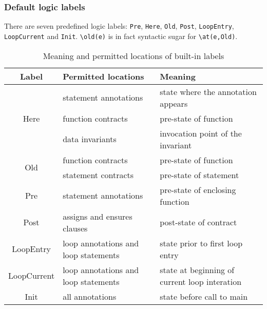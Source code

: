 

\subsubsection*{Default logic labels}\label{sec:default-logic-labels}
There are seven predefined logic labels: \lstinline|Pre|, \lstinline|Here|,
\lstinline|Old|,
\lstinline|Post|, \lstinline|LoopEntry|, \lstinline|LoopCurrent|
and \lstinline|Init|.
\lstinline|\old(e)| is
in fact syntactic sugar for \lstinline|\at(e,Old)|.

\begin{table}
\caption{Meaning and permitted locations of built-in labels}
\label{tab:lables}
\begin{tabular}[t]{|c|p{2.5in}|p{2.5in}|}
\hline
Label & Permitted locations & Meaning \\
\hline
\multirow{3}{*}{Here} & statement annotations & state where the annotation appears \\
                              & function contracts & pre-state of function \\
                              & data invariants & invocation point of the invariant  \\
\hline
\multirow{2}{*}{Old} & function contracts & pre-state of function \\
                             & statement contracts & pre-state of statement \\
\hline
Pre & statement annotations & pre-state of enclosing function \\
\hline
Post & assigns and ensures clauses & post-state of contract \\
\hline
LoopEntry & loop annotations and loop statements & state prior to first loop entry \\
\hline
LoopCurrent & loop annotations and loop statements & state at beginning of current loop interation \\
\hline
Init & all annotations & state before call to main \\
\hline
\end{tabular}
\end{table}

